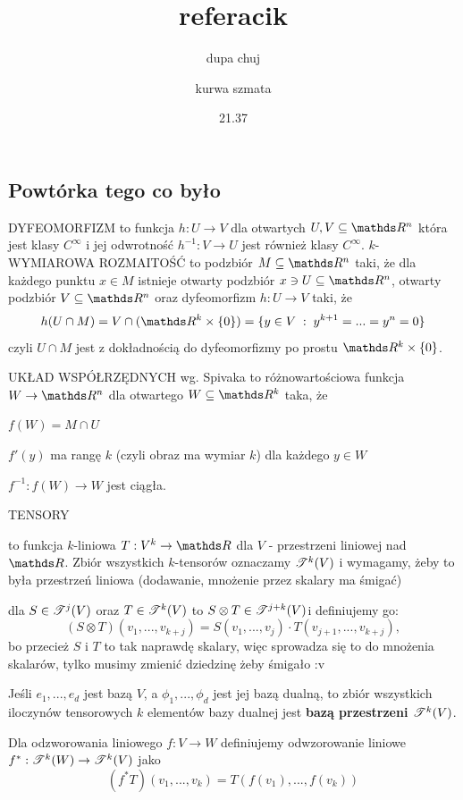 \documentclass{article}
\title{referacik}
\author{dupa chuj \and kurwa szmata}
\date{21.37}
\newcommand{\T}{\rodz{T}}
\begin{document}
\maketitle
\thispagestyle{empty}

\tableofcontents

\subsection{Powtórka tego co było}

{\large\color{def}DYFEOMORFIZM} to funkcja $h:U\to V$ dla otwartych $U,V\subseteq\R^n$ która jest klasy $C^\infty$ i jej odwrotność $h^{-1}:V\to U$ jest również klasy $C^\infty$. {\large\color{def}$k$-WYMIAROWA ROZMAITOŚĆ} to podzbiór $M\subseteq\R^n$ taki, że dla każdego punktu $x\in M$ istnieje otwarty podzbiór $x\ni U\subseteq\R^n$, otwarty podzbiór $V \subseteq\R^n$ oraz dyfeomorfizm $h:U\to V$ taki, że
$$h(U\cap M)=V\cap (\R^k\times\{0\})=\{y\in V\;:\;y^{k+1}=...=y^n=0\}$$
czyli $U\cap M$ jest z dokładnością do dyfeomorfizmy po prostu $\R^k\times\{0\}$.
\medskip

{\large\color{def}UKŁAD WSPÓŁRZĘDNYCH} wg. Spivaka to różnowartościowa funkcja $W\to\R^n$ dla otwartego $W\subseteq\R^k$ taka, że

\point $f(W)=M\cap U$

\point $f'(y)$ ma rangę $k$ (czyli obraz ma wymiar $k$) dla każdego $y\in W$

\point $f^{-1}:f(W)\to W$ jest ciągła.
\medskip

{\large\color{def}TENSORY}
\begin{description}
    \item [$k$-tensor] to funkcja $k$-liniowa $T:V^k\to\R$ dla $V$ - przestrzeni liniowej nad $\R$. Zbiór wszystkich $k$-tensorów oznaczamy $\mathcal{T}^k(V)$ i wymagamy, żeby to była przestrzeń liniowa (dodawanie, mnożenie przez skalary ma śmigać)
    \item [Iloczyn tensorowy] dla $S\in\T^j(V)$ oraz $T\in\T^k(V)$ to $S\otimes T\in\T^{j+k}(V)$i definiujemy go: $$(S\otimes T)(v_1,...,v_{k+j})=S(v_1,...,v_j)\cdot T(v_{j+1},...,v_{k+j}),$$ bo przecież $S$ i $T$ to tak naprawdę skalary, więc sprowadza się to do mnożenia skalarów, tylko musimy zmienić dziedzinę żeby śmigało :v
    \item Jeśli $e_1,...,e_d$ jest bazą $V$, a $\phi_1,...,\phi_d$ jest jej bazą dualną, to zbiór wszystkich iloczynów tensorowych $k$ elementów bazy dualnej jest \textbf{bazą przestrzeni $\T^k(V)$}.
    \item Dla odzworowania liniowego $f:V\to W$ definiujemy odwzorowanie liniowe $f^*:\T^k(W)\to\T^k(V)$ jako $$(f^*T)(v_1,...,v_k)=T(f(v_1),...,f(v_k))$$
\end{description}
\medskip
\end{document}
